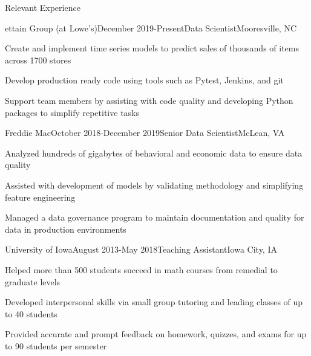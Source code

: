 \documentclass{resume} %
\begin{document}
\begin{rSection}{Relevant Experience}

\begin{rSubsection}{ettain Group (at Lowe's)}{December 2019-Present}{Data Scientist}{Mooresville, NC}
\item Create and implement time series models to predict sales of thousands of items across 1700 stores
\item Develop production ready code using tools such as Pytest, Jenkins, and git
\item Support team members by assisting with code quality and developing Python packages to simplify repetitive tasks
\end{rSubsection}

\begin{rSubsection}{Freddie Mac}{October 2018-December 2019}{Senior Data Scientist}{McLean, VA}
\item Analyzed hundreds of gigabytes of behavioral and economic data to ensure data quality
\item Assisted with development of models by validating methodology and simplifying feature engineering
\item Managed a data governance program to maintain documentation and quality for data in production environments
\end{rSubsection}


\begin{rSubsection}{University of Iowa}{August 2013-May 2018}{Teaching Assistant}{Iowa City, IA}
\item Helped more than 500 students succeed in math courses from remedial to graduate levels
\item Developed interpersonal skills via small group tutoring and leading classes of up to 40 students
\item Provided accurate and prompt feedback on homework, quizzes, and exams for up to 90 students per semester
\end{rSubsection}


\end{rSection}
\end{document}
